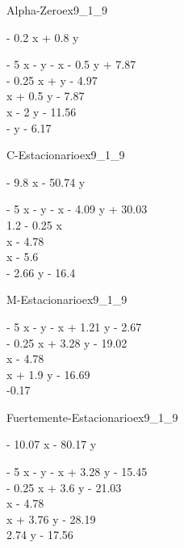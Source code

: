 \begin{bilevelmodel}{Alpha-Zero}{ex9_1_9}
    \begin{upperlevel}{- 0.2 x + 0.8 y}{
        
    }
    \end{upperlevel}
    \begin{lowerlevel}{- 5 x - y}{
         - x - 0.5 y + 7.87  \\ 
 - 0.25 x + y - 4.97  \\ 
 x + 0.5 y - 7.87  \\ 
 x - 2 y - 11.56  \\ 
 - y - 6.17 
    }
    \end{lowerlevel}
\end{bilevelmodel}
    

\begin{bilevelmodel}{C-Estacionario}{ex9_1_9}
    \begin{upperlevel}{- 9.8 x - 50.74 y}{
        
    }
    \end{upperlevel}
    \begin{lowerlevel}{- 5 x - y}{
         - x - 4.09 y + 30.03  \\ 
 1.2 - 0.25 x  \\ 
 x - 4.78  \\ 
 x - 5.6  \\ 
 - 2.66 y - 16.4 
    }
    \end{lowerlevel}
\end{bilevelmodel}
    
        

\begin{bilevelmodel}{M-Estacionario}{ex9_1_9}
    \begin{upperlevel}{0}{
        
    }
    \end{upperlevel}
    \begin{lowerlevel}{- 5 x - y}{
         - x + 1.21 y - 2.67  \\ 
 - 0.25 x + 3.28 y - 19.02  \\ 
 x - 4.78  \\ 
 x + 1.9 y - 16.69  \\ 
 -0.17 
    }
    \end{lowerlevel}
\end{bilevelmodel}
    

\begin{bilevelmodel}{Fuertemente-Estacionario}{ex9_1_9}
    \begin{upperlevel}{- 10.07 x - 80.17 y}{
        
    }
    \end{upperlevel}
    \begin{lowerlevel}{- 5 x - y}{
         - x + 3.28 y - 15.45  \\ 
 - 0.25 x + 3.6 y - 21.03  \\ 
 x - 4.78  \\ 
 x + 3.76 y - 28.19  \\ 
 2.74 y - 17.56 
    }
    \end{lowerlevel}
\end{bilevelmodel}
    
        